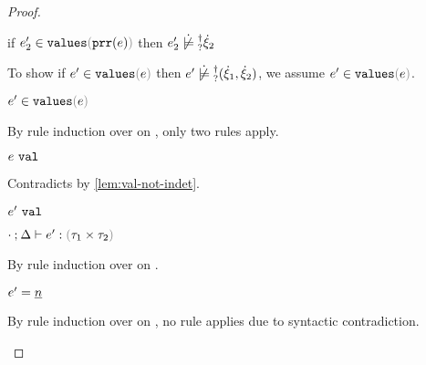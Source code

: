 \begin{proof}
\begin{byCases}
\begin{byCases}
\begin{byCases}
\begin{byCases}
\begin{byCases}
\begin{pfsteps*}
            \item if $\inValues{e_2'}{\hprr{e}}$ then $\cnotsatisfyormay{e_2'}{\hxi_2}$  
            \end{pfsteps*} 
            To show if $\inValues{e'}{e}$ then $\cnotsatisfyormay{e'}{\cpair{\hxi_1}{\hxi_2}}$, we assume $\inValues{e'}{e}$.
            \begin{pfsteps*}
            \item $\inValues{e'}{e}$  
            \end{pfsteps*}
            By rule induction over  on , only two rules apply.
            \begin{byCases}
              \item[\text{(\ref{rule:IVVal})}]
              \begin{pfsteps*}
              \item $e ~\mathtt{val}$ 
              \end{pfsteps*} 
              Contradicts  by \autoref{lem:val-not-indet}.
              \item[\text{(\ref{rule:IVIndet})}] 
              \begin{pfsteps*}
              \item $e' ~\mathtt{val}$  
              \item $\hexptyp{\cdot}{\Delta}{e'}{\tprod{\tau_1}{\tau_2}}$  
              \end{pfsteps*}
              By rule induction over  on .
              \begin{byCases}
                \item[\text{(\ref{rule:VNum})}]
                \begin{pfsteps*}
                \item $e'=\underline{n}$ 
                \end{pfsteps*} 
                By rule induction over  on , no rule applies due to syntactic contradiction.
                \item[\text{(\ref{rule:VLam})}]
                \begin{pfsteps*} 

\end{pfsteps*}
\end{byCases}
\end{byCases}
\end{byCases}
\end{byCases}
\end{byCases}
\end{byCases}
\end{byCases}
\end{proof}
